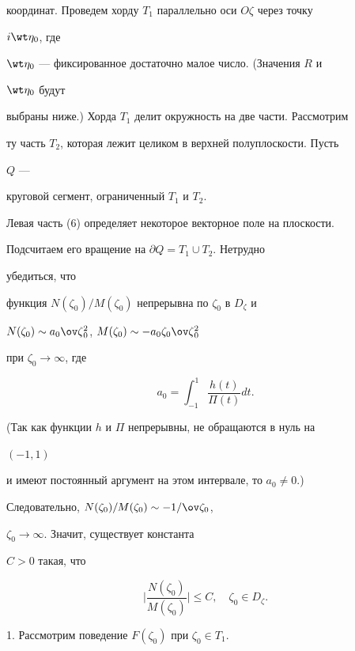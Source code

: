 координат. Проведем хорду $T_1$ параллельно оси $O\zeta$ через точку 


$i\wt\eta_0$, где 


$\wt\eta_0$ --- фиксированное достаточно малое число. (Значения $R$ и 


$\wt\eta_0$ будут 


выбраны ниже.) Хорда $T_1$ делит окружность на две части. Рассмотрим 


ту часть $T_2$, которая лежит целиком в верхней полуплоскости. Пусть 


$Q$ --- 


круговой сегмент, ограниченный $T_1$ и $T_2$. 


 


Левая часть (6) определяет некоторое векторное поле на плоскости. 


Подсчитаем его вращение на $\partial Q=T_1\cup T_2$. Нетрудно 


убедиться, что 


функция $N(\zeta_0)/M(\zeta_0)$ непрерывна по $\zeta_0$ в $D_\zeta$ и 


$N(\zeta_0)\sim a_0\ov\zeta{}^2_0$, $M(\zeta_0)\sim 


-a_0\zeta_0\ov\zeta{}^2_0$ 


при $\zeta_0\to\infty$, где 


$$ 


a_0=\int^1_{-1}\frac{h(t)}{\Pi(t)}dt. 


$$ 


(Так как функции $h$ и $\Pi$ непрерывны, не обращаются в нуль на 


$(-1,1)$ 


и имеют постоянный аргумент на этом интервале, то $a_0\ne0$.) 


Следовательно, $N(\zeta_0)/M(\zeta_0)\sim -1/\ov\zeta_0$, 


$\zeta_0\to\infty$. Значит, существует константа 


$C>0$ такая, что 


$$ 


\bigg|\frac{N(\zeta_0)}{M(\zeta_0)}\bigg|\le C,\quad \zeta_0\in 


D_\zeta. 


$$ 


 


1. Рассмотрим поведение $F(\zeta_0)$ при $\zeta_0\in T_1$. 


 


